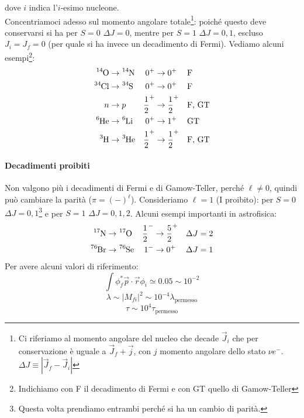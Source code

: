 dove $i$ indica l'$i$-esimo nucleone. \\
Concentriamoci adesso sul momento angolare totale\footnote{Ci riferiamo al momento angolare del nucleo che decade $\vec{J}_i$ che per conservazione è uguale a $\vec{J}_f + \vec{j}$, con $j$ momento angolare dello stato $\nu e^-$. $\Delta J \equiv |\vec{J}_f - \vec{J}_i|$}: poiché questo deve conservarsi si ha per $S=0$ $\Delta J = 0$, mentre per $S=1$ $\Delta J = 0,1$, escluso $J_i=J_f=0$ (per quale si ha invece un decadimento di Fermi). Vediamo alcuni esempi\footnote{Indichiamo con F il decadimento di Fermi e con GT quello di Gamow-Teller}:
\begin{displaymath}
\begin{aligned}
\ce{^{14}O} &\to \ce{^{14}N} & 0^+&\to0^+ & &\text{F} \\
\ce{^{34}Cl} &\to \ce{^{34}S} & 0^+&\to0^+ & &\text{F} \\
n &\to p & \frac{1}{2}^+&\to\frac{1}{2}^+ & &\text{F, GT} \\
\ce{^{6}He} &\to \ce{^{6}Li} & 0^+&\to1^+ & &\text{GT} \\
\ce{^{3}H} &\to \ce{^{3}He} & \frac{1}{2}^+&\to\frac{1}{2}^+ & &\text{F, GT} 
\end{aligned}
\end{displaymath}

\paragraph{Decadimenti proibiti} Non valgono più i decadimenti di Fermi e di Gamow-Teller, perché $\ell\not =0 $, quindi può cambiare la parità ($\pi = (-)^\ell$). Consideriamo $\ell=1$ (I proibito): per $S=0$ $\Delta J = 0,1$\footnote{Questa volta prendiamo entrambi perché si ha un cambio di parità.} e per $S=1$ $\Delta J = 0,1,2$. Alcuni esempi importanti in astrofisica:
\begin{displaymath}
\begin{aligned}
\ce{^{17}N}&\to \ce{^{17}O} & \frac{1}{2}^- &\to \frac{5}{2}^+ & \Delta J = 2 \\
\ce{^{76}Br}&\to \ce{^{76}Se} & 1^- &\to 0^+ & \Delta J = 1
\end{aligned}
\end{displaymath}
Per avere alcuni valori di riferimento:
$$\int \phi_f^* \vec{p}\cdot \vec{r} \phi_i \simeq 0.05 \sim 10^{-2}  $$
$$\lambda \sim |M_{fi}|^2\sim 10^{-4} \lambda_\text{permesso}$$
$$\tau \sim 10^4 \tau_\text{permesso}$$
